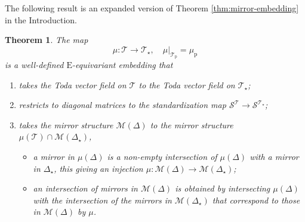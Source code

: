 \documentclass[reqno]{amsart}
\newcommand{\p}{\mathrm{p}}
\newcommand{\cM}{\mathcal{M}}
\newcommand{\cS}{\mathcal{S}}
\newcommand{\cT}{\mathcal{T}}
\newcommand{\E}{\mathrm{E}}
\newtheorem{theorem}{Theorem}[section]
\begin{document}
The following result is an expanded version of Theorem \ref{thm:mirror-embedding} in the Introduction.
\begin{theorem}\label{thm:parallel-transport}
The map
\begin{equation}\label{eq:parallel-transport-isospectral}
 \mu:\cT\to \cT_\star,\quad \mu|_{\cT_\p}=\mu_\p
\end{equation}
is a well-defined $\E$-equivariant embedding that
\begin{enumerate}
\item takes the Toda vector field on $\cT$ to the Toda vector field on $\cT_\star$;
 \item  restricts to diagonal matrices to the standardization map $\cS^{\cT}\to \cS^{\cT_\star}$;
 \item takes the mirror structure $\cM(\Delta)$ to the mirror structure $\mu(\cT)\cap\cM(\Delta_\star)$,
 \begin{itemize}
  \item  a  mirror in $\mu(\Delta)$ is a non-empty intersection of $\mu(\Delta)$ with a mirror in $\Delta_\star$, this giving an injection $\mu:\cM(\Delta)\to \cM(\Delta_\star)$;
  \item an intersection of mirrors in $\cM(\Delta)$ is obtained by intersecting $\mu(\Delta)$ with the intersection of the mirrors in $\cM(\Delta_\star)$ that correspond to those in $\cM(\Delta)$ by $\mu$.
  \end{itemize}
\end{enumerate}
\end{theorem}
\end{document}
